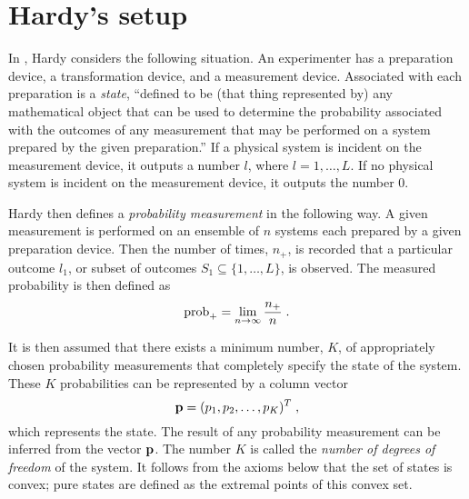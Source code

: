 \documentclass[pra,12pt,tightenlines]{revtex4}
\begin{document}
$\;$ \section{Hardy's setup}  \label{sec:Hardy}

In \cite{Hardy-0101},  Hardy considers the following situation. An
experimenter has a preparation device, a transformation device, and a
measurement device.  Associated with each preparation is a {\it state},
``defined to be (that thing represented by) any mathematical object that can
be used to determine the probability associated with the outcomes of any
measurement that may be performed on a system prepared by the given
preparation.''  If a physical system is incident on the measurement device, it
outputs a number $l$, where $l=1,\ldots,L$. If no physical system is incident
on the measurement device, it outputs the number 0.

Hardy then defines a {\it probability measurement\/} in the following way.  A
given measurement is performed on an ensemble of $n$ systems each prepared by
a given preparation device. Then the number of times, $n_+$, is recorded that a
particular outcome $l_1$, or subset of outcomes $S_1\subseteq\{1,\ldots,L\}$,
is observed.  The measured probability is then defined as
\begin{equation}
{\rm prob}_+ = \lim_{n\rightarrow\infty} {n_+\over n} \;.
\end{equation}

It is then assumed that there exists a minimum number, $K$, of appropriately
chosen probability measurements that completely specify the state of the
system. These $K$ probabilities can be represented by a column vector
\begin{equation}
 \p = (p_1,p_2,\ldots,p_K)^T \;,
\end{equation}
which  represents the state. The result of any probability
measurement can be inferred from the vector ${\bf p}$. The number $K$ is called
the {\it number of degrees of freedom\/} of the system. It follows from
the axioms below that the set of states is convex; pure states are defined
as the extremal points of this convex set.
\end{document}
